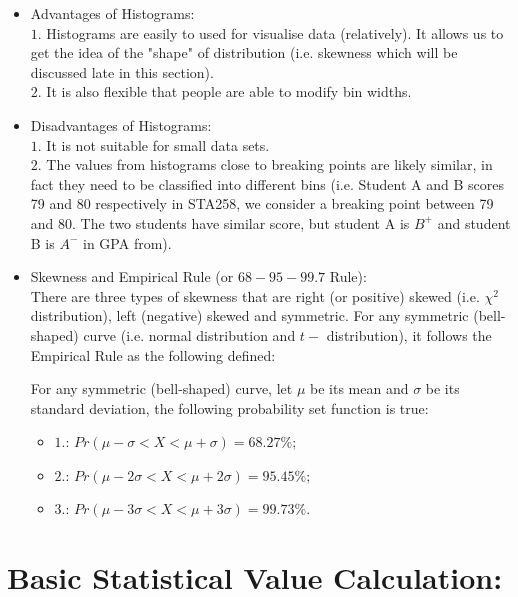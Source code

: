\begin{itemize}
	\item Advantages of Histograms:\\
	$1.$ Histograms are easily to used for visualise data (relatively). It allows us to get the idea of the "shape" of distribution (i.e. skewness which will be discussed late in this section).\\
	$2.$ It is also flexible that people are able to modify bin widths.
	\item Disadvantages of Histograms:\\
	$1.$ It is not suitable for small data sets.\\
	$2.$ The values from histograms close to breaking points are likely similar, in fact they need to be classified into different bins (i.e. Student A and B scores 79 and 80 respectively in 		STA258, we consider a breaking point between 79 and 80. The two students have similar score, but student A is $B^+$ and student B is $A^-$ in GPA from).
	\item Skewness and Empirical Rule (or $68-95-99.7$ Rule):\\
		There are three types of skewness that are right (or positive) skewed (i.e. $\chi^{2}$ distribution), left (negative) skewed and symmetric. For any symmetric (bell-shaped) curve (i.e. normal distribution and $t-$ distribution), it follows the Empirical Rule as the following defined:
		\begin{definition}
		For any symmetric (bell-shaped) curve, let $\mu$ be its mean and $\sigma$ be its standard deviation, the following probability set function is true:
			\begin{itemize}
				\item  $1.$: $Pr(\mu - \sigma < X < \mu + \sigma) = 68.27\%;$
				\item  $2.$: $Pr(\mu - 2\sigma < X < \mu + 2\sigma) = 95.45\%;$
				\item  $3.$: $Pr(\mu - 3\sigma < X < \mu + 3\sigma) = 99.73\%.$
			\end{itemize}
		\end{definition}
		
	
\end{itemize}

\section{Basic Statistical Value Calculation:}

